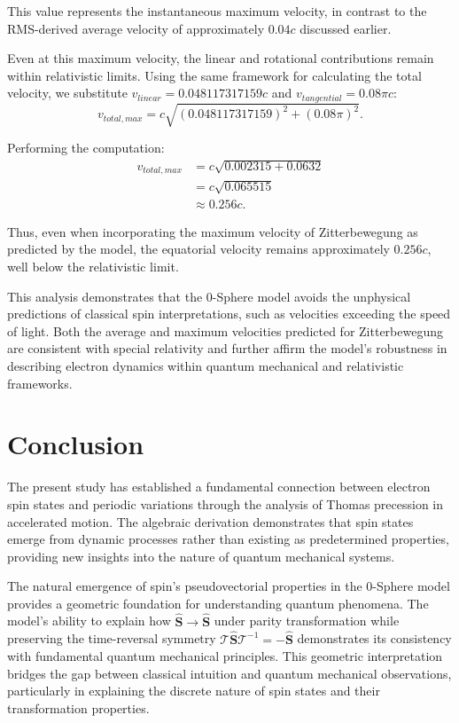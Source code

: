 \documentclass[%
 reprint,
 amsmath,amssymb,
 aps,
]{revtex4-1}
\numberwithin{equation}{section}%
\begin{document}
This value represents the instantaneous maximum velocity, in contrast to the RMS-derived average velocity of approximately $0.04c$ discussed earlier.

Even at this maximum velocity, the linear and rotational contributions remain within relativistic limits. Using the same framework for calculating the total velocity, we substitute $v_{linear} = 0.048117317159c$ and $v_{tangential} = 0.08\pi c$:
\begin{equation}
v_{total, max} = c\sqrt{(0.048117317159)^2 + (0.08\pi)^2}.
\end{equation}

Performing the computation:
\begin{equation}
\begin{aligned}
v_{total, max} &= c\sqrt{0.002315 + 0.0632} \\ &
= c\sqrt{0.065515} \\ &
\approx 0.256c.
\end{aligned}
\end{equation}

Thus, even when incorporating the maximum velocity of Zitterbewegung as predicted by the model, the equatorial velocity remains approximately $0.256c$, well below the relativistic limit. 

This analysis demonstrates that the 0-Sphere model avoids the unphysical predictions of classical spin interpretations, such as velocities exceeding the speed of light. Both the average and maximum velocities predicted for Zitterbewegung are consistent with special relativity and further affirm the model's robustness in describing electron dynamics within quantum mechanical and relativistic frameworks.


\section{Conclusion}
\label{sec:conclusion}

The present study has established a fundamental connection between electron spin states and periodic variations through the analysis of Thomas precession in accelerated motion. The algebraic derivation demonstrates that spin states emerge from dynamic processes rather than existing as predetermined properties, providing new insights into the nature of quantum mechanical systems.

The natural emergence of spin's pseudovectorial properties in the 0-Sphere model provides a geometric foundation for understanding quantum phenomena. The model's ability to explain how \( \hat{\boldsymbol{S}} \rightarrow \hat{\boldsymbol{S}} \) under parity transformation while preserving the time-reversal symmetry \( \mathcal{T}\hat{\boldsymbol{S}}\mathcal{T}^{-1} = -\hat{\boldsymbol{S}} \) demonstrates its consistency with fundamental quantum mechanical principles. This geometric interpretation bridges the gap between classical intuition and quantum mechanical observations, particularly in explaining the discrete nature of spin states and their transformation properties.
\end{document}
